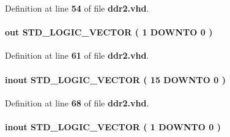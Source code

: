 Definition at line {\bf 54} of file {\bf ddr2.\+vhd}.

\paragraph[{mem\+\_\+dm}]{ {\bfseries \textcolor{keywordflow}{out}\textcolor{vhdlchar}{ }} {\bfseries \textcolor{comment}{S\+T\+D\+\_\+\+L\+O\+G\+I\+C\+\_\+\+V\+E\+C\+T\+OR}\textcolor{vhdlchar}{ }\textcolor{vhdlchar}{(}\textcolor{vhdlchar}{ }\textcolor{vhdlchar}{ } \textcolor{vhdldigit}{1} \textcolor{vhdlchar}{ }\textcolor{keywordflow}{D\+O\+W\+N\+TO}\textcolor{vhdlchar}{ }\textcolor{vhdlchar}{ } \textcolor{vhdldigit}{0} \textcolor{vhdlchar}{ }\textcolor{vhdlchar}{)}\textcolor{vhdlchar}{ }} \hspace{0.3cm}{\ttfamily [Port]}}\label{classddr2_a0b830fa20909f3f790e039430e43d833}


Definition at line {\bf 61} of file {\bf ddr2.\+vhd}.

\paragraph[{mem\+\_\+dq}]{ {\bfseries \textcolor{keywordflow}{inout}\textcolor{vhdlchar}{ }} {\bfseries \textcolor{comment}{S\+T\+D\+\_\+\+L\+O\+G\+I\+C\+\_\+\+V\+E\+C\+T\+OR}\textcolor{vhdlchar}{ }\textcolor{vhdlchar}{(}\textcolor{vhdlchar}{ }\textcolor{vhdlchar}{ } \textcolor{vhdldigit}{15} \textcolor{vhdlchar}{ }\textcolor{keywordflow}{D\+O\+W\+N\+TO}\textcolor{vhdlchar}{ }\textcolor{vhdlchar}{ } \textcolor{vhdldigit}{0} \textcolor{vhdlchar}{ }\textcolor{vhdlchar}{)}\textcolor{vhdlchar}{ }} \hspace{0.3cm}{\ttfamily [Port]}}\label{classddr2_a523acbc776ea0d4bb3636c1762b97bbb}


Definition at line {\bf 68} of file {\bf ddr2.\+vhd}.

\paragraph[{mem\+\_\+dqs}]{ {\bfseries \textcolor{keywordflow}{inout}\textcolor{vhdlchar}{ }} {\bfseries \textcolor{comment}{S\+T\+D\+\_\+\+L\+O\+G\+I\+C\+\_\+\+V\+E\+C\+T\+OR}\textcolor{vhdlchar}{ }\textcolor{vhdlchar}{(}\textcolor{vhdlchar}{ }\textcolor{vhdlchar}{ } \textcolor{vhdldigit}{1} \textcolor{vhdlchar}{ }\textcolor{keywordflow}{D\+O\+W\+N\+TO}\textcolor{vhdlchar}{ }\textcolor{vhdlchar}{ } \textcolor{vhdldigit}{0} \textcolor{vhdlchar}{ }\textcolor{vhdlchar}{)}\textcolor{vhdlchar}{ }} \hspace{0.3cm}{\ttfamily [Port]}}\label{classddr2_a4dc9f36564489295eb0ba3ba315de770}


